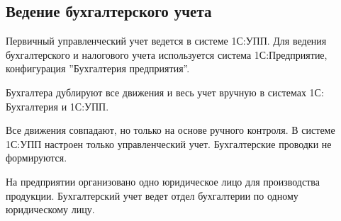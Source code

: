 \subsection{Ведение бухгалтерского учета}
Первичный управленческий учет ведется в системе 1С:УПП.
Для ведения бухгалтерского и налогового учета используется система 1С:Предприятие, конфигурация ''Бухгалтерия предприятия''.

Бухгалтера дублируют все движения и весь учет вручную в системах 1С: Бухгалтерия и 1С:УПП.

Все движения совпадают, но только на основе ручного контроля. В системе 1С:УПП настроен только управленческий учет. Бухгалтерские проводки не формируются.

На предприятии организовано одно юридическое лицо для производства продукции.
Бухгалтерский учет ведет отдел бухгалтерии по одному юридическому лицу.

